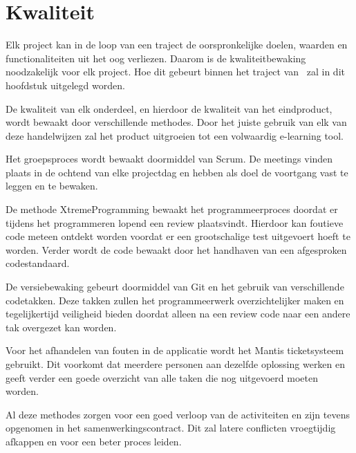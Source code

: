 \chapter{Kwaliteit} 
Elk project kan in de loop van een traject de oorspronkelijke doelen, waarden en functionaliteiten uit het oog verliezen. Daarom is de kwaliteitbewaking noodzakelijk voor elk project. Hoe dit gebeurt binnen het traject van \projectname\ zal in dit hoofdstuk uitgelegd worden.

De kwaliteit van elk onderdeel, en hierdoor de kwaliteit van het eindproduct, wordt bewaakt door verschillende methodes. Door het juiste gebruik van elk van deze handelwijzen zal het product uitgroeien tot een volwaardig e-learning tool.

Het groepsproces wordt bewaakt doormiddel van Scrum. De meetings vinden plaats in de ochtend van elke projectdag en hebben als doel de voortgang vast te leggen en te bewaken.

De methode XtremeProgramming bewaakt het programmeerproces doordat er tijdens het programmeren lopend een review plaatsvindt. Hierdoor kan foutieve code meteen ontdekt worden voordat er een grootschalige test uitgevoert hoeft te worden.
Verder wordt de code bewaakt door het handhaven van een afgesproken codestandaard.

De versiebewaking gebeurt doormiddel van Git en het gebruik van verschillende codetakken. Deze takken zullen het programmeerwerk overzichtelijker maken en tegelijkertijd veiligheid bieden doordat alleen na een review code naar een andere tak overgezet kan worden.

Voor het afhandelen van fouten in de applicatie wordt het Mantis ticketsysteem gebruikt. Dit voorkomt dat meerdere personen aan dezelfde oplossing werken en geeft verder een goede overzicht van alle taken die nog uitgevoerd moeten worden.

Al deze methodes zorgen voor een goed verloop van de activiteiten en zijn tevens opgenomen in het samenwerkingscontract. Dit zal latere conflicten vroegtijdig afkappen en voor een beter proces leiden.
